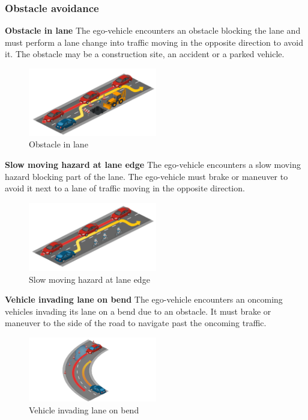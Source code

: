\documentclass{article}
\begin{document}
\subsubsection{Obstacle avoidance}
\textbf{Obstacle in lane} 
The ego-vehicle encounters an obstacle blocking the lane and must perform a lane change into traffic moving in the opposite direction to avoid it. 
The obstacle may be a construction site, an accident or a parked vehicle.
\begin{figure}[h]
    \centering
    \includegraphics[width=0.5\textwidth]{img/TR14a.png}
    \caption{Obstacle in lane} \label{Scenario_obstacle}
\end{figure}

\textbf{Slow moving hazard at lane edge} 
The ego-vehicle encounters a slow moving hazard blocking part of the lane. The ego-vehicle must brake or maneuver to avoid it next to a lane of traffic 
moving in the opposite direction.
\begin{figure}[h]
    \centering
    \includegraphics[width=0.5\textwidth]{img/TR16a.png}
    \caption{Slow moving hazard at lane edge} \label{Scenario_slowMove}
\end{figure}

\textbf{Vehicle invading lane on bend} 
The ego-vehicle encounters an oncoming vehicles invading its lane on a bend due to an obstacle. It must brake or maneuver to the side of the road 
to navigate past the oncoming traffic.
\begin{figure}[h]
    \centering
    \includegraphics[width=0.5\textwidth]{img/TR22.png}
    \caption{Vehicle invading lane on bend} \label{Scenario_vehicleInvading}
\end{figure}
\end{document}
